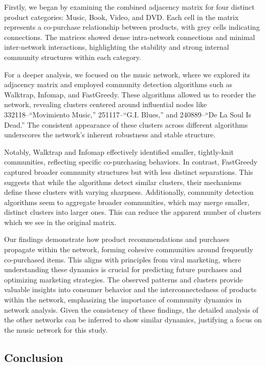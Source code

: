 \documentclass[
]{article}
\begin{document}
Firstly, we began by examining the combined adjacency matrix for four
distinct product categories: Music, Book, Video, and DVD. Each cell in
the matrix represents a co-purchase relationship between products, with
grey cells indicating connections. The matrices showed dense
intra-network connections and minimal inter-network interactions,
highlighting the stability and strong internal community structures
within each category.

For a deeper analysis, we focused on the music network, where we
explored its adjacency matrix and employed community detection
algorithms such as Walktrap, Infomap, and FastGreedy. These algorithms
allowed us to reorder the network, revealing clusters centered around
influential nodes like 332118--``Movimiento Music,'' 251117--``G.I.
Blues,'' and 240889--``De La Soul Is Dead.'' The consistent appearance
of these clusters across different algorithms underscores the network's
inherent robustness and stable structure.

Notably, Walktrap and Infomap effectively identified smaller,
tightly-knit communities, reflecting specific co-purchasing behaviors.
In contrast, FastGreedy captured broader community structures but with
less distinct separations. This suggests that while the algorithms
detect similar clusters, their mechanisms define these clusters with
varying sharpness. Additionally, community detection algorithms seem to
aggregate broader communities, which may merge smaller, distinct
clusters into larger ones. This can reduce the apparent number of
clusters which we see in the original matrix.

Our findings demonstrate how product recommendations and purchases
propagate within the network, forming cohesive communities around
frequently co-purchased items. This aligns with principles from viral
marketing, where understanding these dynamics is crucial for predicting
future purchases and optimizing marketing strategies. The observed
patterns and clusters provide valuable insights into consumer behavior
and the interconnectedness of products within the network, emphasizing
the importance of community dynamics in network analysis. Given the
consistency of these findings, the detailed analysis of the other
networks can be inferred to show similar dynamics, justifying a focus on
the music network for this study.

\subsection{Conclusion}\label{conclusion}
\end{document}
